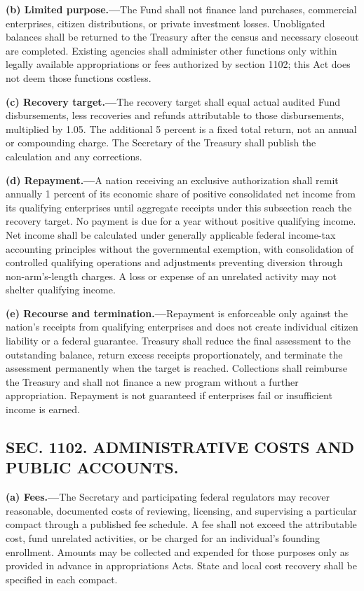 \documentclass[12pt,letterpaper]{article}
\begin{document}
\textbf{(b) Limited purpose.---}The Fund shall not finance land purchases, commercial enterprises, citizen distributions, or private investment losses. Unobligated balances shall be returned to the Treasury after the census and necessary closeout are completed. Existing agencies shall administer other functions only within legally available appropriations or fees authorized by section 1102; this Act does not deem those functions costless.

\textbf{(c) Recovery target.---}The recovery target shall equal actual audited Fund disbursements, less recoveries and refunds attributable to those disbursements, multiplied by 1.05. The additional 5 percent is a fixed total return, not an annual or compounding charge. The Secretary of the Treasury shall publish the calculation and any corrections.

\textbf{(d) Repayment.---}A nation receiving an exclusive authorization shall remit annually 1 percent of its economic share of positive consolidated net income from its qualifying enterprises until aggregate receipts under this subsection reach the recovery target. No payment is due for a year without positive qualifying income. Net income shall be calculated under generally applicable federal income-tax accounting principles without the governmental exemption, with consolidation of controlled qualifying operations and adjustments preventing diversion through non-arm's-length charges. A loss or expense of an unrelated activity may not shelter qualifying income.

\textbf{(e) Recourse and termination.---}Repayment is enforceable only against the nation's receipts from qualifying enterprises and does not create individual citizen liability or a federal guarantee. Treasury shall reduce the final assessment to the outstanding balance, return excess receipts proportionately, and terminate the assessment permanently when the target is reached. Collections shall reimburse the Treasury and shall not finance a new program without a further appropriation. Repayment is not guaranteed if enterprises fail or insufficient income is earned.

\subsection*{SEC. 1102. ADMINISTRATIVE COSTS AND PUBLIC ACCOUNTS.}

\textbf{(a) Fees.---}The Secretary and participating federal regulators may recover reasonable, documented costs of reviewing, licensing, and supervising a particular compact through a published fee schedule. A fee shall not exceed the attributable cost, fund unrelated activities, or be charged for an individual's founding enrollment. Amounts may be collected and expended for those purposes only as provided in advance in appropriations Acts. State and local cost recovery shall be specified in each compact.
\end{document}
